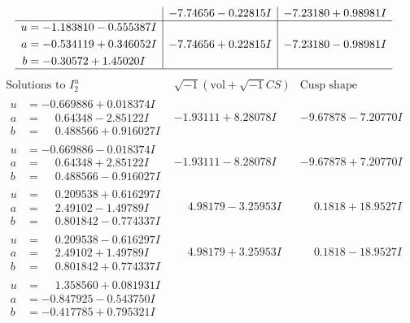 \documentclass[1p]{elsarticle_modified}
\theoremstyle{definition}
\newcommand{\I}{\sqrt{-1}}
\begin{document}
$$\begin{array}{c|c|c}
 & -7.74656 - 0.22815 I & -7.23180 + 0.98981 I \\ \hline\begin{aligned}
u &= -1.183810 - 0.555387 I \\
a &= -0.534119 + 0.346052 I \\
b &= -0.30572 + 1.45020 I\end{aligned}
 & -7.74656 + 0.22815 I & -7.23180 - 0.98981 I\\
 \hline 
 \end{array}$$\newpage$$\begin{array}{c|c|c}  
\text{Solutions to }I^u_{2}& \I (\text{vol} + \sqrt{-1}CS) & \text{Cusp shape}\\
 \hline 
\begin{aligned}
u &= -0.669886 + 0.018374 I \\
a &= \phantom{-}0.64348 - 2.85122 I \\
b &= \phantom{-}0.488566 + 0.916027 I\end{aligned}
 & -1.93111 + 8.28078 I & -9.67878 - 7.20770 I \\ \hline\begin{aligned}
u &= -0.669886 - 0.018374 I \\
a &= \phantom{-}0.64348 + 2.85122 I \\
b &= \phantom{-}0.488566 - 0.916027 I\end{aligned}
 & -1.93111 - 8.28078 I & -9.67878 + 7.20770 I \\ \hline\begin{aligned}
u &= \phantom{-}0.209538 + 0.616297 I \\
a &= \phantom{-}2.49102 - 1.49789 I \\
b &= \phantom{-}0.801842 - 0.774337 I\end{aligned}
 & \phantom{-}4.98179 - 3.25953 I & \phantom{-}0.1818 + 18.9527 I \\ \hline\begin{aligned}
u &= \phantom{-}0.209538 - 0.616297 I \\
a &= \phantom{-}2.49102 + 1.49789 I \\
b &= \phantom{-}0.801842 + 0.774337 I\end{aligned}
 & \phantom{-}4.98179 + 3.25953 I & \phantom{-}0.1818 - 18.9527 I \\ \hline\begin{aligned}
u &= \phantom{-}1.358560 + 0.081931 I \\
a &= -0.847925 - 0.543750 I \\
b &= -0.417785 + 0.795321 I\end{aligned}

\end{array}$$
\end{document}
